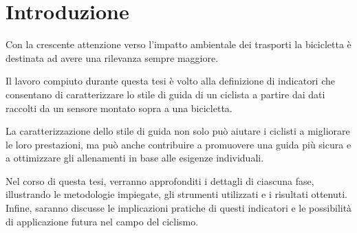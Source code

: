 \documentclass[class=article]{standalone}
\begin{document}
	\section{Introduzione}

	Con la crescente attenzione verso l'impatto ambientale dei trasporti la bicicletta è destinata ad avere una rilevanza sempre maggiore.

	Il lavoro compiuto durante questa tesi è volto alla definizione di indicatori che consentano di caratterizzare lo stile di guida di un ciclista a partire dai dati raccolti da un sensore montato sopra a una bicicletta. 
	
		
 	La caratterizzazione dello stile di guida non solo può aiutare i ciclisti a migliorare le loro prestazioni, ma può anche contribuire a promuovere una guida più sicura e a ottimizzare gli allenamenti in base alle esigenze individuali. 

	Nel corso di questa tesi, verranno approfonditi i dettagli di ciascuna fase, illustrando le metodologie impiegate, gli strumenti utilizzati e i risultati ottenuti. Infine, saranno discusse le implicazioni pratiche di questi indicatori e le possibilità di applicazione futura nel campo del ciclismo.
\end{document}
